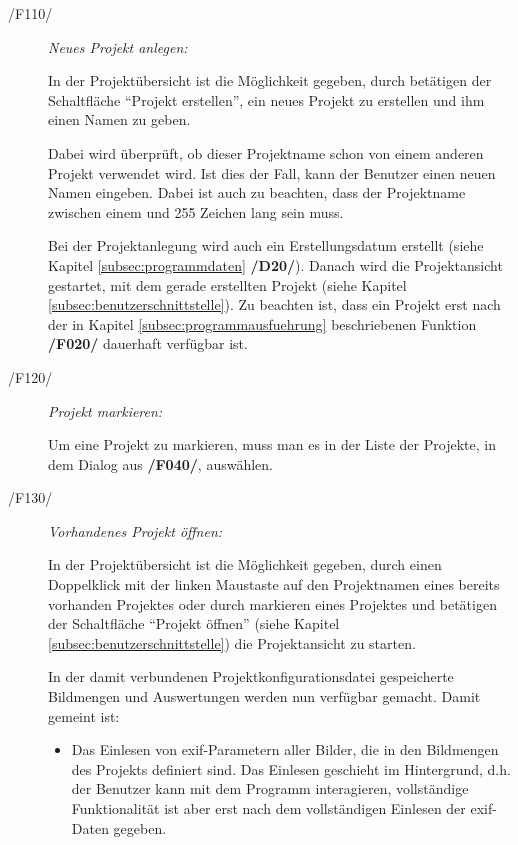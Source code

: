 	\begin{description}		
		
		\item[/F110/] \textit{Neues Projekt anlegen:}\par In der Projektübersicht ist die Möglichkeit gegeben, durch betätigen der Schaltfläche "`Projekt erstellen"', ein neues Projekt zu erstellen und ihm einen Namen zu geben.\par Dabei wird überprüft, ob dieser Projektname schon von einem anderen Projekt verwendet wird. Ist dies der Fall, kann der Benutzer einen neuen Namen eingeben. Dabei ist auch zu beachten, dass der Projektname zwischen einem und 255 Zeichen lang sein muss.\par Bei der Projektanlegung wird auch ein Erstellungsdatum erstellt (siehe Kapitel \ref{subsec:programmdaten} \textbf{/D20/}). Danach wird die Projektansicht gestartet, mit dem gerade erstellten Projekt (siehe Kapitel \ref{subsec:benutzerschnittstelle}). Zu beachten ist, dass ein Projekt erst nach der in Kapitel \ref{subsec:programmausfuehrung} beschriebenen Funktion \textbf{/F020/} dauerhaft verfügbar ist. 
		
		\item[/F120/] \textit{Projekt markieren:}\par Um eine Projekt zu markieren, muss man es in der Liste der Projekte, in dem Dialog aus \textbf{/F040/}, auswählen.
		
		\item[/F130/] \textit{Vorhandenes Projekt öffnen:}\par In der Projektübersicht ist die Möglichkeit gegeben, durch einen Doppelklick mit der linken Maustaste auf den Projektnamen eines bereits vorhanden Projektes oder durch markieren eines Projektes und betätigen der Schaltfläche "`Projekt öffnen"' (siehe Kapitel \ref{subsec:benutzerschnittstelle}) die Projektansicht zu starten.\par In der damit verbundenen Projektkonfigurationsdatei gespeicherte Bildmengen und Auswertungen werden nun verfügbar gemacht. Damit gemeint ist: 
			
			\begin{itemize}
				
				\item Das Einlesen von \gls{exif}-Parametern aller Bilder, die in den Bildmengen des Projekts definiert sind. Das Einlesen geschieht im Hintergrund, d.h. der Benutzer kann mit dem Programm interagieren, vollständige Funktionalität ist aber erst nach dem vollständigen Einlesen der \gls{exif}-Daten gegeben.
				

\end{itemize}
\end{description}
